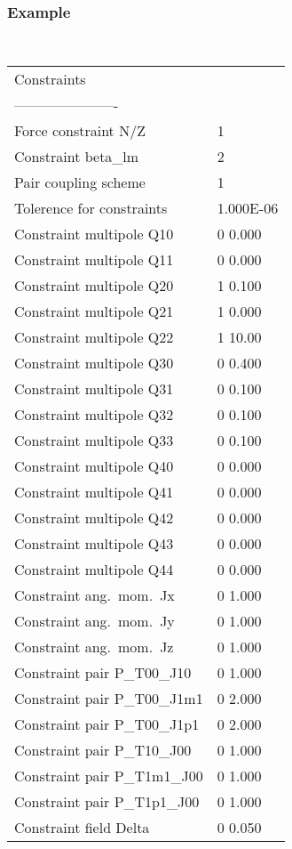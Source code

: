 \documentclass[a4paper,11pt]{article}
\begin{document}
\subsubsection*{Example}
\begin{center}
\tt
\begin{tabular}{|ll|}
\hline
Constraints                     &          \\
----------------------          &          \\
Force constraint N/Z            &1         \\
Constraint beta\_lm             &2         \\
Pair coupling scheme            &1         \\
Tolerence for constraints       &1.000E-06 \\
Constraint multipole Q10        &0 0.000   \\
Constraint multipole Q11        &0 0.000   \\
Constraint multipole Q20        &1 0.100   \\
Constraint multipole Q21        &1 0.000   \\
Constraint multipole Q22        &1 10.00   \\
Constraint multipole Q30        &0 0.400   \\
Constraint multipole Q31        &0 0.100   \\
Constraint multipole Q32        &0 0.100   \\
Constraint multipole Q33        &0 0.100   \\
Constraint multipole Q40        &0 0.000   \\
Constraint multipole Q41        &0 0.000   \\
Constraint multipole Q42        &0 0.000   \\
Constraint multipole Q43        &0 0.000   \\
Constraint multipole Q44        &0 0.000   \\
Constraint ang.\ mom.\ Jx       &0 1.000   \\
Constraint ang.\ mom.\ Jy       &0 1.000   \\
Constraint ang.\ mom.\ Jz       &0 1.000   \\
Constraint pair P\_T00\_J10     &0 1.000   \\
Constraint pair P\_T00\_J1m1    &0 2.000   \\
Constraint pair P\_T00\_J1p1    &0 2.000   \\
Constraint pair P\_T10\_J00     &0 1.000   \\
Constraint pair P\_T1m1\_J00    &0 1.000   \\
Constraint pair P\_T1p1\_J00    &0 1.000   \\
Constraint field Delta          &0 0.050   \\
\hline
\end{tabular}
\end{center}

%
%
\end{document}
